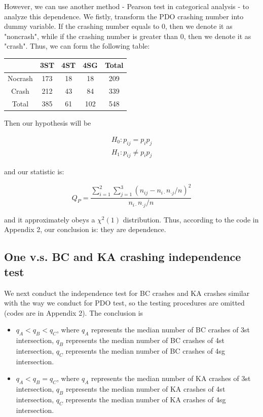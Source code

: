 \documentclass[11pt]{scrartcl} %
\begin{document}
\par
However, we can use another method - Pearson test in categorical analysis - to analyze this dependence. We fistly, transform the PDO crashing number into dummy variable. If the crashing number equals to 0, then we denote it as "noncrash", while if the crashing number is greater than 0, then we denote it as "crash". Thus, we can form the following table:

\begin{table}[H]
\begin{tabular}{|c|c|c|c|c|}
\hline
      & 3ST & 4ST & 4SG & Total \\
\hline
Nocrash & 173 & 18  & 18 & 209 \\
\hline
Crash    & 212  & 43  & 84  & 339 \\
\hline
Total    & 385  & 61  & 102  & 548 \\
\hline
\end{tabular}
\end{table}

Then our hypothesis will be

\begin{equation*}
\begin{array}{l}
{H_0}:{p_{ij}} = {p_i}{p_j}\\
{H_1}:{p_{ij}} \ne {p_i}{p_j}
\end{array}
\end{equation*}

and our statistic is:

\begin{equation*}
{Q_P} = \frac{{\sum\limits_{i = 1}^2 {\sum\limits_{j = 1}^3 {{{\left( {{n_{ij}} - {n_{i \cdot }}{n_{ \cdot j}}/n} \right)}^2}} } }}{{{n_{i \cdot }}{n_{ \cdot j}}/n}}
\end{equation*}

and it approximately obeys a ${\chi ^2}\left( 1 \right)$ distribution. Thus, according to the code in Appendix 2, our conclusion is: they are dependence.

\subsection{One v.s. BC and KA crashing independence test}

We next conduct the independence test for BC crashes and KA crashes similar with the way we conduct for PDO test, so the testing procedures are omitted (codes are in Appendix 2). The conclusion is

\begin{itemize}
	\item ${q_A} < {q_B} < {q_C}$, where $q_A$ represents the median number of BC crashes of 3st intersection, $q_B$ represents the median number of BC crashes of 4st intersection, $q_C$ represents the median number of BC crashes of 4sg intersection.
	\item ${q_A} < {q_B} = {q_C}$, where $q_A$ represents the median number of KA crashes of 3st intersection, $q_B$ represents the median number of KA crashes of 4st intersection, $q_C$ represents the median number of KA crashes of 4sg intersection.
\end{itemize}
\end{document}
